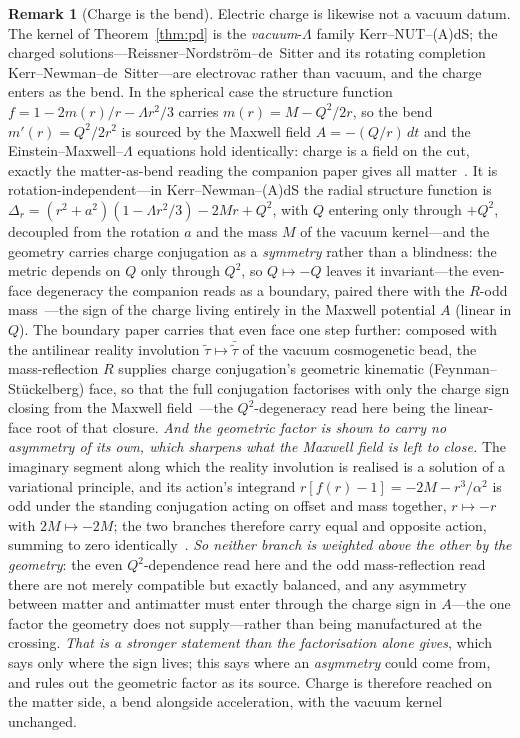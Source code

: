 \documentclass[11pt,a4paper]{article}
\theoremstyle{definition}
\newtheorem{remark}[theorem]{Remark}
\begin{document}
\begin{remark}[Charge is the bend]\label{rem:charge}
Electric charge is likewise not a vacuum datum. The kernel of Theorem~\ref{thm:pd} is the \emph{vacuum}-$\Lambda$ family Kerr--NUT--(A)dS; the charged solutions---Reissner--Nordstr\"om--de~Sitter and its rotating completion Kerr--Newman--de~Sitter---are electrovac rather than vacuum, and the charge enters as the bend. In the spherical case the structure function $f=1-2m(r)/r-\Lambda r^{2}/3$ carries $m(r)=M-Q^{2}/2r$, so the bend $m'(r)=Q^{2}/2r^{2}$ is sourced by the Maxwell field $A=-(Q/r)\,dt$ and the Einstein--Maxwell--$\Lambda$ equations hold identically: charge is a field on the cut, exactly the matter-as-bend reading the companion paper gives all matter~\cite{JanzenOperator}. It is rotation-independent---in Kerr--Newman--(A)dS the radial structure function is $\Delta_{r}=(r^{2}+a^{2})(1-\Lambda r^{2}/3)-2Mr+Q^{2}$, with $Q$ entering only through $+Q^{2}$, decoupled from the rotation $a$ and the mass $M$ of the vacuum kernel---and the geometry carries charge conjugation as a \emph{symmetry} rather than a blindness: the metric depends on $Q$ only through $Q^{2}$, so $Q\mapsto-Q$ leaves it invariant---the even-face degeneracy the companion reads as a boundary, paired there with the $R$-odd mass~\cite{JanzenBoundary}---the sign of the charge living entirely in the Maxwell potential $A$ (linear in $Q$). The boundary paper carries that even face one step further: composed with the antilinear reality involution $\tilde\tau\mapsto\bar{\tilde\tau}$ of the vacuum cosmogenetic bead, the mass-reflection $R$ supplies charge conjugation's geometric kinematic (Feynman--St\"uckelberg) face, so that the full conjugation factorises with only the charge sign closing from the Maxwell field~\cite{JanzenBoundary}---the $Q^{2}$-degeneracy read here being the linear-face root of that closure. \emph{And the geometric factor is shown to carry no asymmetry of its own, which sharpens what
the Maxwell field is left to close.} The imaginary segment along which the reality involution is realised is a
solution of a variational principle, and its action's integrand $r[f(r)-1]=-2M-r^{3}/\alpha^{2}$ is odd under
the standing conjugation acting on offset and mass together, $r\mapsto-r$ with $2M\mapsto-2M$; the two branches
therefore carry equal and opposite action, summing to zero identically~\cite{JanzenCosmogenesis}. \emph{So
neither branch is weighted above the other by the geometry}: the even $Q^{2}$-dependence read here and the odd
mass-reflection read there are not merely compatible but exactly balanced, and any asymmetry between matter and
antimatter must enter through the charge sign in $A$---the one factor the geometry does not supply---rather
than being manufactured at the crossing. \emph{That is a stronger statement than the factorisation alone
gives}, which says only where the sign lives; this says where an \emph{asymmetry} could come from, and rules
out the geometric factor as its source. Charge is therefore reached on the matter side, a bend alongside acceleration, with the vacuum kernel unchanged.
\end{remark}
\end{document}

